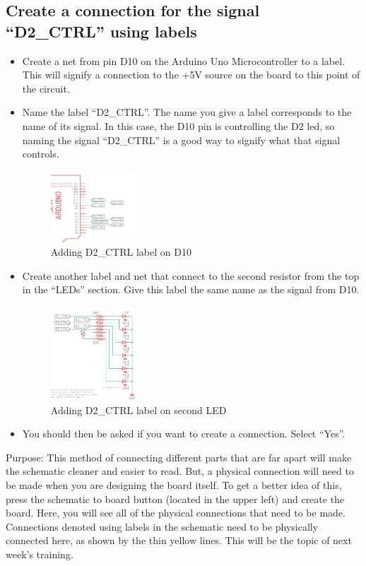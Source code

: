 \documentclass{article}
\begin{document}
\subsection{Create a connection for the signal “D2\_CTRL” using labels}
\begin{itemize}
    \item Create a net from pin D10 on the Arduino Uno Microcontroller to a label. This will signify a connection to the +5V source on the board to this point of the circuit.
    \item  Name the label “D2\_CTRL”. The name you give a label corresponds to the name of its signal. In this case, the D10 pin is controlling the D2 led, so naming the signal “D2\_CTRL” is a good way to signify what that signal controls.
    \begin{figure}[ht]
	\center
	\includegraphics[width=0.3\textwidth, keepaspectratio]{images/5.4.1.png}
	\caption{Adding D2\_CTRL label on D10}
	\label{fig:5.4.1}
\end{figure}
    \item Create another label and net that connect to the second resistor from the top in the “LEDs” section.  Give this label the same name as the signal from D10.
    \begin{figure}[ht]
	\center
	\includegraphics[width=0.3\textwidth, keepaspectratio]{images/5.4.2.png}
	\caption{Adding D2\_CTRL label on second LED}
	\label{fig:5.4.2}
    \end{figure}
    \item You should then be asked if you want to create a connection. Select “Yes”.
\end{itemize}
Purpose: This method of connecting different parts that are far apart will make the schematic cleaner and easier to read. But, a physical connection will need to be made when you are designing the board itself. To get a better idea of this, press the schematic to board button (located in the upper left) and create the board. Here, you will see all of the physical connections that need to be made. Connections denoted using labels in the schematic need to be physically connected here, as shown by the thin yellow lines. This will be the topic of next week’s training.
\end{document}
